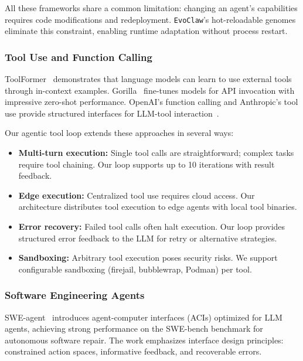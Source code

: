 \documentclass{article}
\newcommand{\evoclaw}{\texttt{EvoClaw}\xspace}
\begin{document}
All these frameworks share a common limitation: changing an agent's capabilities requires code modifications and redeployment. \evoclaw{}'s hot-reloadable genomes eliminate this constraint, enabling runtime adaptation without process restart.

\subsubsection{Tool Use and Function Calling}

ToolFormer~\cite{schick2023toolformer} demonstrates that language models can learn to use external tools through in-context examples. Gorilla~\cite{parisi2023gorilla} fine-tunes models for API invocation with impressive zero-shot performance. OpenAI's function calling and Anthropic's tool use provide structured interfaces for LLM-tool interaction~\cite{openai2023function}.

Our agentic tool loop extends these approaches in several ways:

\begin{itemize}[leftmargin=*]
    \item \textbf{Multi-turn execution:} Single tool calls are straightforward; complex tasks require tool chaining. Our loop supports up to 10 iterations with result feedback.
    
    \item \textbf{Edge execution:} Centralized tool use requires cloud access. Our architecture distributes tool execution to edge agents with local tool binaries.
    
    \item \textbf{Error recovery:} Failed tool calls often halt execution. Our loop provides structured error feedback to the LLM for retry or alternative strategies.
    
    \item \textbf{Sandboxing:} Arbitrary tool execution poses security risks. We support configurable sandboxing (firejail, bubblewrap, Podman) per tool.
\end{itemize}

\subsubsection{Software Engineering Agents}

SWE-agent~\cite{yang2024sweagent} introduces agent-computer interfaces (ACIs) optimized for LLM agents, achieving strong performance on the SWE-bench benchmark for autonomous software repair. The work emphasizes interface design principles: constrained action spaces, informative feedback, and recoverable errors.
\end{document}
